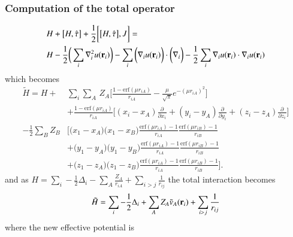 \documentclass[aip,jcp,reprint,noshowkeys,superscriptaddress]{revtex4-1}
\newcommand{\deriv}[3]{\frac{\partial^{#3} #1}{\partial {#2}^{#3}}}
\newcommand{\br}[0]{{\bf {r}}}
\begin{document}
\subsubsection{Computation of the total operator}
\begin{equation}
 \begin{aligned}
& H + \big[ H,\hat{\tau} \big] + \frac{1}{2} \bigg[ \big[H,\hat{\tau}\big],J\bigg] = \\ & H -\frac{1}{2} \bigg( \sum_i \nabla^2_i u(\br{}_i) \bigg)    
                                                                   -\sum_i \bigg(\nabla_i u(\br{}_i) \bigg) \cdot \bigg( \nabla_i  \bigg)  
                                                                   -\frac{1}{2}\sum_i \nabla_i u({\bf r}_i) \cdot \nabla_i u({\bf r}_i) 
 \end{aligned}
\end{equation}
which becomes
\begin{equation}
 \begin{aligned}
  \tilde{H} = H +&  \sum_i \sum_{A}\, Z_A  \bigg[ \frac{1 - \text{erf}(\mu r_{iA})}{r_{iA}}  - \frac{\mu}{\sqrt{\pi}} e^{-(\mu r_{iA})^2}  \bigg] \\
           &+  \frac{1 - \text{erf}(\mu r_{iA})}{r_{iA}} \bigg[ (x_i - x_A) \deriv{}{x_i}{} + (y_i - y_A) \deriv{}{y_i}{} + (z_i - z_A) \deriv{}{z_i}{}\bigg] \\
           - \frac{1}{2}\sum_{B} Z_B &\bigg[ \big( x_1 - x_A \big) \big( x_1 - x_B \big)  \frac{\text{erf}(\mu r_{iA}) - 1}{r_{iA}} \frac{\text{erf}(\mu r_{iB}) - 1}{r_{iB}} \\
           &+  \big( y_1 - y_A \big) \big( y_1 - y_B \big)  \frac{\text{erf}(\mu r_{iA}) - 1}{r_{iA}} \frac{\text{erf}(\mu r_{iB}) - 1}{r_{iB}} \\ 
           &+  \big( z_1 - z_A \big) \big( z_1 - z_B \big)  \frac{\text{erf}(\mu r_{iA}) - 1}{r_{iA}} \frac{\text{erf}(\mu r_{iB}) - 1}{r_{iB} } \bigg].
 \end{aligned}
\end{equation}
and as $H = \sum_i -\frac{1}{2} \Delta_i - \sum_A \frac{Z_A}{r_{iA}} + \sum_{i>j} \frac{1}{r_{ij}} $ the total interaction becomes 
\begin{equation}
 \label{eq:final_one_e_h}
 \tilde{H} =  \sum_i -\frac{1}{2} \Delta_i + \sum_A Z_A \tilde{v}_A({\bf r}_i)  + \sum_{i>j} \frac{1}{r_{ij}}
\end{equation}
where the new effective potential is 
\end{document}
